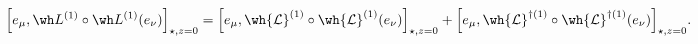 \begin{equation}
\Big[e_\mu,\wh L^{(1)}\circ\wh L^{(1)}(e_\nu)\Big]_{\star,z=0} =
\Big[e_\mu,\wh{\mathcal{L}}^{(1)}\circ\wh{\mathcal{L}}^{(1)}(e_\nu)\Big]_{\star,z=0} + 
\Big[e_\mu,\wh{\mathcal{L}}^{\dagger(1)}\circ
 \wh{\mathcal{L}}^{\dagger(1)}(e_\nu)\Big]_{\star,z=0}.
\label{eq:eL1L1}
\end{equation}

